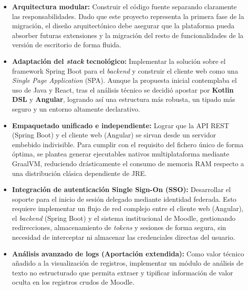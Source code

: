\begin{itemize}
    \item \textbf{Arquitectura modular:} Construir el código fuente separando claramente las responsabilidades. Dado que este proyecto representa la primera fase de la migración, el diseño arquitectónico debe asegurar que la plataforma pueda absorber futuras extensiones y la migración del resto de funcionalidades de la versión de escritorio de forma fluida.

    \item \textbf{Adaptación del \textit{stack} tecnológico:} Implementar la solución sobre el framework Spring Boot para el \textit{backend} y construir el cliente web como una \textit{Single Page Application} (SPA). Aunque la propuesta inicial contemplaba el uso de Java y React, tras el análisis técnico se decidió apostar por \textbf{Kotlin DSL} y \textbf{Angular}, logrando así una estructura más robusta, un tipado más seguro y un entorno altamente declarativo.

    \item \textbf{Empaquetado unificado e independiente:} Lograr que la API REST (Spring Boot) y el cliente web (Angular) se sirvan desde un servidor embebido indivisible. Para cumplir con el requisito del fichero único de forma óptima, se plantea generar ejecutables nativos multiplataforma mediante GraalVM, reduciendo drásticamente el consumo de memoria RAM respecto a una distribución clásica dependiente de JRE.

    \item \textbf{Integración de autenticación Single Sign-On (SSO):} Desarrollar el soporte para el inicio de sesión delegado mediante identidad federada. Esto requiere implementar un flujo de red complejo entre el cliente web (Angular), el \textit{backend} (Spring Boot) y el sistema institucional de Moodle, gestionando redirecciones, almacenamiento de \textit{tokens} y sesiones de forma segura, sin necesidad de interceptar ni almacenar las credenciales directas del usuario.

    \item \textbf{Análisis avanzado de logs (Aportación extendida):} Como valor técnico añadido a la visualización de registros, implementar un módulo de análisis de texto no estructurado que permita extraer y tipificar información de valor oculta en los registros crudos de Moodle.
\end{itemize}
